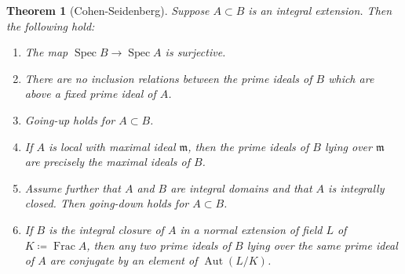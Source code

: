 \documentclass[leqno, openany]{memoir}
\newtheorem{thm}{Theorem}[section]
\theoremstyle{definition}
\theoremstyle{remark}
\theoremstyle{plain}
\theoremstyle{definition}
\theoremstyle{remark}
\newcommand{\mf}[1]{\mathfrak{#1}}
\DeclareMathOperator{\Aut}{Aut}
\DeclareMathOperator{\Spec}{Spec}
\begin{document}
\begin{thm}[Cohen-Seidenberg] Suppose $A \subset B$ is an integral extension.
    Then the following hold: \begin{enumerate} \item The map $\Spec B \to \Spec
        A$ is surjective.  \item There are no inclusion relations between the
        prime ideals of $B$ which are above a fixed prime ideal of $A$.  \item
        Going-up holds for $A \subset B$.  \item If $A$ is local with maximal
        ideal $\mf{m}$, then the prime ideals of $B$ lying over $\mf{m}$ are
        precisely the maximal ideals of $B$.  \item Assume further that $A$ and
        $B$ are integral domains and that $A$ is integrally closed. Then
        going-down holds for $A \subset B$.  \item If $B$ is the integral
        closure of $A$ in a normal extension of field $L$ of $K \coloneqq
        \operatorname{Frac} A$, then any two prime ideals of $B$ lying over the
        same prime ideal of $A$ are conjugate by an element of $\Aut(L/K)$.
\end{enumerate} \end{thm}
\end{document}
